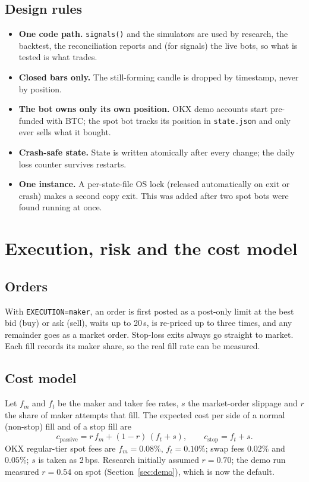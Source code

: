 \documentclass[11pt,a4paper]{article}
\newcommand{\code}[1]{\texttt{\small #1}}
\begin{document}
\subsection{Design rules}
\begin{itemize}
\item \textbf{One code path.} \code{signals()} and the simulators are used by research, the
backtest, the reconciliation reports and (for signals) the live bots, so what is tested is what
trades.
\item \textbf{Closed bars only.} The still-forming candle is dropped by timestamp, never by
position.
\item \textbf{The bot owns only its own position.} OKX demo accounts start pre-funded with BTC;
the spot bot tracks its position in \code{state.json} and only ever sells what it bought.
\item \textbf{Crash-safe state.} State is written atomically after every change; the daily loss
counter survives restarts.
\item \textbf{One instance.} A per-state-file OS lock (released automatically on exit or crash)
makes a second copy exit. This was added after two spot bots were found running at once.
\end{itemize}

\section{Execution, risk and the cost model}\label{sec:costs}
\subsection{Orders}
With \code{EXECUTION=maker}, an order is first posted as a post-only limit at the best bid
(buy) or ask (sell), waits up to 20\,s, is re-priced up to three times, and any remainder goes
as a market order. Stop-loss exits always go straight to market. Each fill records its maker
share, so the real fill rate can be measured.

\subsection{Cost model}
Let $f_m$ and $f_t$ be the maker and taker fee rates, $s$ the market-order slippage and $r$ the
share of maker attempts that fill. The expected cost per side of a normal (non-stop) fill and of
a stop fill are
\begin{equation}
c_{\text{passive}} = r\,f_m + (1-r)\,(f_t + s), \qquad c_{\text{stop}} = f_t + s .
\end{equation}
OKX regular-tier spot fees are $f_m=0.08\%$, $f_t=0.10\%$; swap fees $0.02\%$ and $0.05\%$; $s$ is
taken as 2\,bps. Research initially assumed $r=0.70$; the demo run measured $r=0.54$ on spot
(Section~\ref{sec:demo}), which is now the default.
\end{document}
